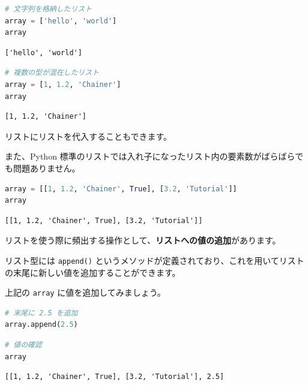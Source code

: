 \begin{lstlisting}[style=codecell,language=Python]
# 文字列を格納したリスト
array = ['hello', 'world']
array
\end{lstlisting}

\begin{lstlisting}[style=outputcell]
['hello', 'world']
\end{lstlisting}

\begin{lstlisting}[style=codecell,language=Python]
# 複数の型が混在したリスト
array = [1, 1.2, 'Chainer']
array
\end{lstlisting}

\begin{lstlisting}[style=outputcell]
[1, 1.2, 'Chainer']
\end{lstlisting}

リストにリストを代入することもできます。

また、Python 標準のリストでは入れ子になったリスト内の要素数がばらばらでも問題ありません。


\begin{lstlisting}[style=codecell,language=Python]
array = [[1, 1.2, 'Chainer', True], [3.2, 'Tutorial']]
array
\end{lstlisting}

\begin{lstlisting}[style=outputcell]
[[1, 1.2, 'Chainer', True], [3.2, 'Tutorial']]
\end{lstlisting}

リストを使う際に頻出する操作として、\textbf{リストへの値の追加}があります。

リスト型には \texttt{append()} というメソッドが定義されており、これを用いてリストの末尾に新しい値を追加することができます。


上記の \texttt{array} に値を追加してみましょう。


\begin{lstlisting}[style=codecell,language=Python]
# 末尾に 2.5 を追加
array.append(2.5)
\end{lstlisting}

\begin{lstlisting}[style=codecell,language=Python]
# 値の確認
array
\end{lstlisting}

\begin{lstlisting}[style=outputcell]
[[1, 1.2, 'Chainer', True], [3.2, 'Tutorial'], 2.5]
\end{lstlisting}

